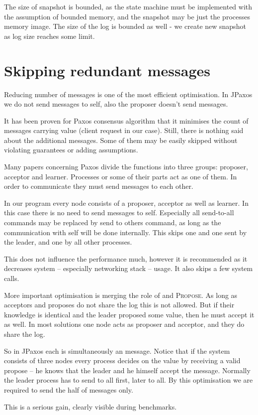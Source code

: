 The size of snapshot is bounded, as the state machine must be implemented with the assumption of bounded memory, and the snapshot may be just the processes memory image. The size of the log is bounded as well - we create new snapshot as log size reaches some limit.


\section{Skipping redundant messages}
Reducing number of messages is one of the most efficient optimisation. In JPaxos we do not send messages to self, also the proposer doesn't send \accept messages.

It has been proven for Paxos consensus algorithm that it minimises the count of messages carrying value (client request in our case). Still, there is nothing said about the additional messages. Some of them may be easily skipped without violating guarantees or adding assumptions.


Many papers concerning Paxos divide the functions into three groups: proposer, acceptor and learner. Processes or some of their parts act as one of them. In order to communicate they must send messages to each other.

In our program every node consists of a proposer, acceptor as well as learner. In this case there is no need to send messages to self. Especially all send-to-all commands may be replaced by send to others command, as long as the communication with self will be done internally. This skips one \accept and one \propose sent by the leader, and one \accept by all other processes.

This does not influence the performance much, however it is recommended as it decreases system -- especially networking stack -- usage. It also skips a few system calls.


More important optimisation is merging the role of \accept and \textsc{Propose}. As long as acceptors and proposes do not share the log this is not allowed. But if their knowledge is identical and the leader proposed some value, then he must accept it as well. In most solutions one node acts as proposer and acceptor, and they do share the log.

So in JPaxos each \propose is simultaneously an \accept message. Notice that if the system consists of three nodes every process decides on the value by receiving a valid propose -- he knows that the leader and he himself accept the message. Normally the leader process has to send \propose to all first, later \accept to all. By this optimisation we are required to send the half of messages only.

This is a serious gain, clearly visible during benchmarks.

